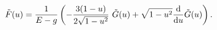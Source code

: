 \begin{equation}
{\tilde F}(u) = \frac{1}{E-g} \left(
- \frac{3(1-u)}{2 \sqrt{1-u^2}}~ {\tilde G}(u) 
+ \sqrt{1-u^2} \frac{{\rm d}}{{\rm d} u} {\tilde G}(u) 
\right).
\end{equation}

